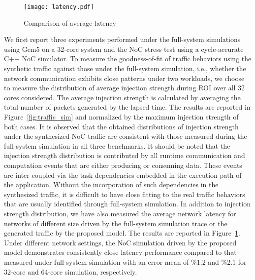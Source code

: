 \begin{figure}[ht]
  \centering
  \texttt{[image: latency.pdf]}
  \vskip -3mm
  \caption{Comparison of average latency}
  \label{fig:lat}
  \vskip -5mm
\end{figure}
We first report three experiments performed under the full-system simulations using Gem5 on a 32-core system and the NoC stress test using a cycle-accurate C++ NoC simulator. To measure the goodness-of-fit of traffic behaviors using the synthetic traffic against those under the full-system simulation, i.e., whether the network communication exhibits close patterns under two workloads, we choose to measure the distribution of average injection strength during ROI over all 32 cores considered.  The average injection strength is calculated by averaging the total number of packets generated by the lapsed time. The results are reported in Figure~\ref{fig:traffic_sim} and normalized by the maximum injection strength of both cases. It is observed that the obtained distributions of injection strength under the synthesized NoC traffic are consistent with those measured during the full-system simulation in all three benchmarks. It should be noted that the injection strength distribution is contributed by all runtime communication and computation events that are either producing or consuming data. These events are inter-coupled via the task dependencies embedded in the execution path of the application.  Without the incorporation of such dependencies in the synthesized traffic, it is difficult to have close fitting to the real traffic behaviors that are usually identified through full-system simulation. In addition to injection strength distribution, we have also measured the average network latency for networks of different size driven by the full-system simulation trace or the generated traffic by the proposed model. The results are reported in Figure~\ref{fig:lat}. Under different network settings, the NoC simulation driven by the proposed model demonstrates consistently  close latency performance compared to that measured under full-system simulation with an error mean of $\%1.2$ and $\%2.1$ for 32-core and 64-core simulation, respectively.\\
